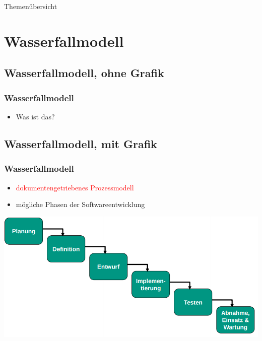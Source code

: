 \documentclass[18pt]{beamer}
\begin{document}
\begin{frame}{Themenübersicht}
\tableofcontents
\end{frame}

\section{Wasserfallmodell}
	\subsection{Wasserfallmodell, ohne Grafik}
	\begin{frame}
		\frametitle{Wasserfallmodell}
		\begin{itemize}
			\item Was ist das? 
		\end{itemize}
	\end{frame}
	
	\subsection{Wasserfallmodell, mit Grafik}
	\begin{frame}
		\frametitle{Wasserfallmodell}
		\begin{itemize}
			\item \textcolor{red}{dokumentengetriebenes Prozessmodell} \pause
			\item mögliche Phasen der Softwareentwicklung \pause
		\end{itemize}
		\includegraphics[scale=0.4]{./pics/tut1/waterfall_without-docs.png}
	\end{frame}
	
\end{document}
